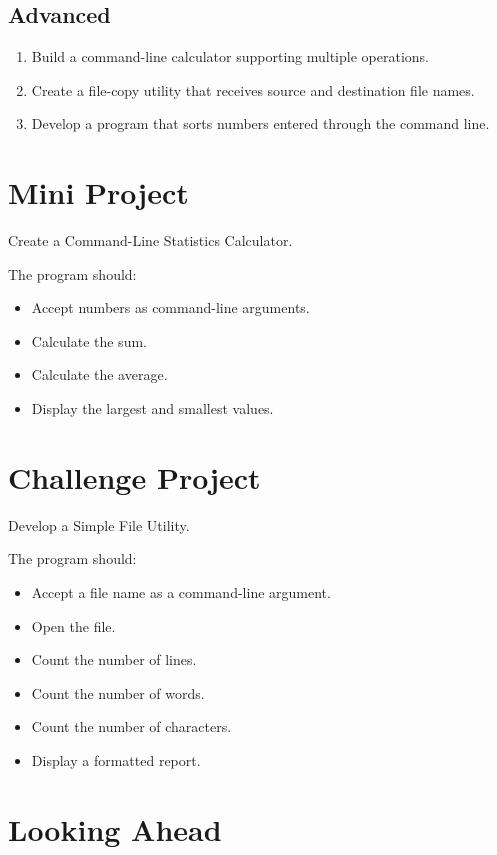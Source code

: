 \documentclass[12pt,openany]{book}
\begin{document}
\subsection*{Advanced}

\begin{enumerate}
    \item Build a command-line calculator supporting multiple operations.
    \item Create a file-copy utility that receives source and destination file names.
    \item Develop a program that sorts numbers entered through the command line.
\end{enumerate}

\section{Mini Project}

Create a Command-Line Statistics Calculator.

The program should:

\begin{itemize}
    \item Accept numbers as command-line arguments.
    \item Calculate the sum.
    \item Calculate the average.
    \item Display the largest and smallest values.
\end{itemize}

\section{Challenge Project}

Develop a Simple File Utility.

The program should:

\begin{itemize}
    \item Accept a file name as a command-line argument.
    \item Open the file.
    \item Count the number of lines.
    \item Count the number of words.
    \item Count the number of characters.
    \item Display a formatted report.
\end{itemize}

\section{Looking Ahead}
\end{document}
